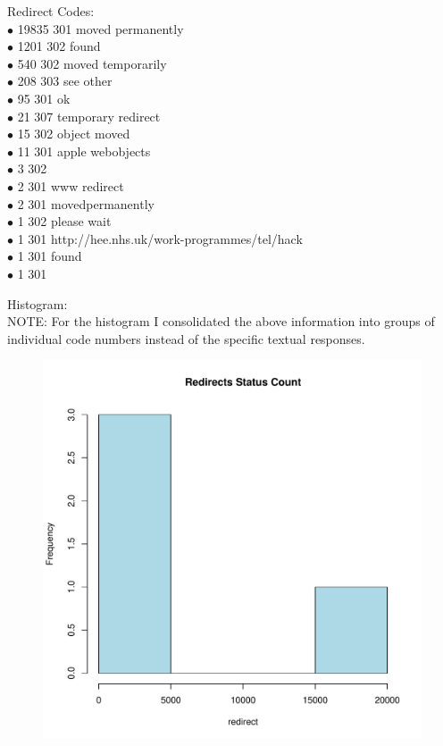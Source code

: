 \documentclass[12pt]{report}
\begin{document}
Redirect Codes:\\
$\bullet$  19835 301 moved permanently\\
$\bullet$   1201 302 found\\
$\bullet$    540 302 moved temporarily\\
$\bullet$    208 303 see other\\
$\bullet$     95 301 ok\\
$\bullet$     21 307 temporary redirect\\
$\bullet$     15 302 object moved\\
$\bullet$     11 301 apple webobjects\\
$\bullet$      3 302\\
$\bullet$      2 301 www redirect\\
$\bullet$      2 301 movedpermanently\\
$\bullet$      1 302 please wait\\
$\bullet$      1 301 http://hee.nhs.uk/work-programmes/tel/hack\\
$\bullet$      1 301 found\\
$\bullet$      1 301

Histogram:\\
NOTE: For the histogram I consolidated the above information into groups of individual code numbers instead of the specific textual responses.\\
\begin{figure}
    \centering
    \includegraphics{redirectsPlot.pdf}
\end{figure}
\end{document}
